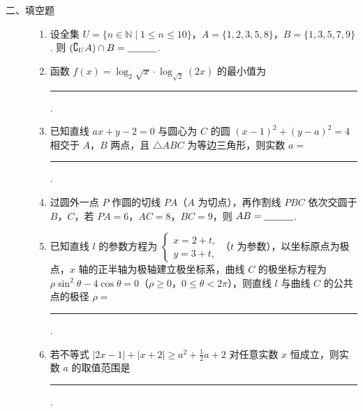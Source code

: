 \begin{description}

    \item[二、填空题]

    \begin{enumerate}[leftmargin=5pt]

      \addtocounter{enumi}{+10}

        \item 设全集 \(U = \{n \in \mathbb{N} \mid 1 \leqslant n \leqslant 10\}\)，\(A = \{1, 2, 3, 5, 8\}\)，\(B = \{1, 3, 5, 7, 9\}\). 则 \((\complement_U A) \cap B =\rule[-0.3ex]{3em}{0.4pt}\).

        \item 函数 \( f(x) = \log_{2}\sqrt{x} \cdot \log_{\sqrt{2}}(2x) \) 的最小值为\rule[-0.3ex]{3em}{0.4pt}.

        \item 已知直线 \(ax + y - 2 = 0\) 与圆心为 \(C\) 的圆 \((x - 1)^2 + (y - a)^2 = 4\) 相交于 \(A\)，\(B\) 两点，且 \(\triangle ABC\) 为等边三角形，则实数 \(a = \)\rule[-0.3ex]{3em}{0.4pt}.

        \item 过圆外一点 \(P\) 作圆的切线 \(PA\)（\(A\) 为切点），再作割线 \(PBC\) 依次交圆于 \(B\)，\(C\)，若 \(PA = 6\)，\(AC = 8\)，\(BC = 9\)，则 \(AB =\rule[-0.3ex]{3em}{0.4pt}\).

        \item 已知直线 \(l\) 的参数方程为 \( \begin{cases}
x=2+t,\\
y=3+t,
\end{cases} \)（\(t\) 为参数），以坐标原点为极点，\(x\) 轴的正半轴为极轴建立极坐标系，曲线 \(C\) 的极坐标方程为 \( \rho\sin^{2}\theta-4\cos\theta=0 \)（\(\rho\geqslant0\)，\(0\leqslant\theta<2\pi\)），则直线 \(l\) 与曲线 \(C\) 的公共点的极径 \( \rho= \)\rule[-0.3ex]{3em}{0.4pt}.

        \item 若不等式 \( \left|2x-1\right|+\left|x+2\right|\geqslant a^{2}+\frac{1}{2}a+2 \) 对任意实数 \(x\) 恒成立，则实数 \(a\) 的取值范围是\rule[-0.3ex]{3em}{0.4pt}.

    \end{enumerate}

\end{description}

